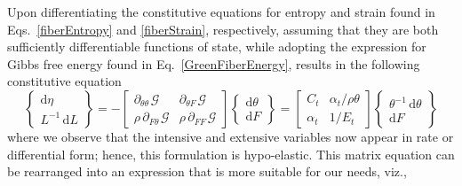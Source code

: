 Upon differentiating the constitutive equations for entropy and strain found in Eqs.~\ref{fiberEntropy} and \ref{fiberStrain}, respectively, assuming that they are both sufficiently differentiable functions of state, while adopting the expression for Gibbs free energy found in Eq.~\ref{GreenFiberEnergy}, results in the following constitutive equation
\begin{displaymath}
\left\{ \begin{matrix}
\mathrm{d} \eta \\ L^{-1} \, \mathrm{d} L 
\end{matrix} \right\} = -\begin{bmatrix}
\partial_{\theta\theta\,} \mathcal{G} & \partial_{\theta F\,} \mathcal{G} \\
\rho \, \partial_{F\theta\,} \mathcal{G} & \rho \, \partial_{FF\,} \mathcal{G}
\end{bmatrix} 
\left\{ \begin{matrix}
\mathrm{d} \theta \\ \mathrm{d} F
\end{matrix} \right\}
= \begin{bmatrix}
C_t & \alpha_t / \rho \theta \\
\alpha_t & 1 / E_t
\end{bmatrix}
\left\{ \begin{matrix}
\theta^{-1} \, \mathrm{d} \theta \\ \mathrm{d} F
\end{matrix} \right\} 
\end{displaymath}
where we observe that the intensive and extensive variables now appear in rate or differential form; hence, this formulation is hypo-elastic. \cite{Truesdell55}  This matrix equation can be rearranged into an expression that is more suitable for our needs, viz.,

